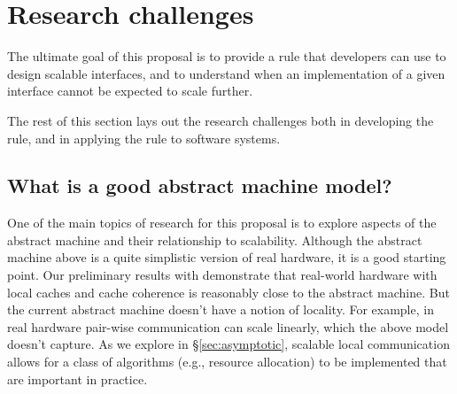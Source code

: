 \section{Research challenges}
\label{sec:research}

The ultimate goal of this proposal is to provide a rule that developers
can use to design scalable interfaces, and to understand when an
implementation of a given interface cannot be expected to scale
further.
\begin{comment}
There are a number of challenges in providing such a rule.  First,
the rule must be precise and intuitive to help developers make clear
decisions.  Second, the rule must capture how an interface might scale
under different workloads, which we hope to represent using a hierarchy
of scalability classes.  Third, the rule should capture scalability on
real hardware.  Finally, the programmer should be able to check whether
their implementation achieves the goal set out by the commutativity rule.

To evaluate whether our commutativity rule is meaningful for systems
software, we will apply the rule to both existing systems with rich
interfaces, such as Linux, and to new systems that we build, which will
give us the freedom to choose more commutative (and thus more scalable)
APIs and to quickly explore different implementations.
\end{comment}
The rest of this section lays out the research challenges both in
developing the rule, and in applying the rule to software systems.


\subsection{What is a good abstract machine model?}

One of the main topics of research for this proposal is to explore
aspects of the abstract machine and their relationship to scalability.
Although the abstract machine above is a quite simplistic version of
real hardware, it is a good starting point.  Our preliminary results
with \sys demonstrate that real-world hardware with local caches and
cache coherence is reasonably close to the abstract machine.
%
But the current abstract machine doesn't have a notion
of locality.  For example, in real hardware pair-wise communication
can scale linearly, which the above model doesn't capture.  As we
explore in \S\ref{sec:asymptotic}, scalable local communication allows
for a class of algorithms (e.g., resource allocation) to be implemented
that are important in practice.

